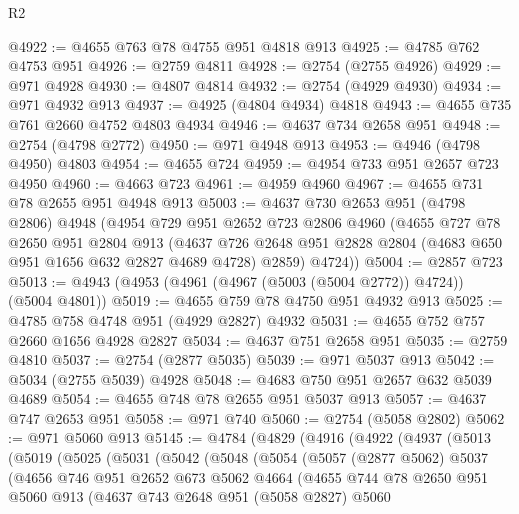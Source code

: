 \begin{lexlean}{R2}
\begin{coremodule}
@4922 := @4655 @763 @78 @4755 @951 @4818 @913
@4925 := @4785 @762 @4753 @951
@4926 := @2759 @4811
@4928 := @2754 (@2755 @4926)
@4929 := @971 @4928
@4930 := @4807 @4814
@4932 := @2754 (@4929 @4930)
@4934 := @971 @4932 @913
@4937 := @4925 (@4804 @4934) @4818
@4943 := @4655 @735 @761 @2660 @4752 @4803 @4934
@4946 := @4637 @734 @2658 @951
@4948 := @2754 (@4798 @2772)
@4950 := @971 @4948 @913
@4953 := @4946 (@4798 @4950) @4803
@4954 := @4655 @724
@4959 := @4954 @733 @951 @2657 @723 @4950
@4960 := @4663 @723
@4961 := @4959 @4960
@4967 := @4655 @731 @78 @2655 @951 @4948 @913
@5003 := @4637
    @730
    @2653
    @951
    (@4798 @2806)
    @4948
    (@4954
      @729
      @951
      @2652
      @723
      @2806
      @4960
      (@4655
        @727
        @78
        @2650
        @951
        @2804
        @913
        (@4637 @726 @2648 @951 @2828 @2804 (@4683 @650 @951 @1656 @632 @2827 @4689 @4728) @2859)
        @4724))
@5004 := @2857 @723
@5013 := @4943 (@4953 (@4961 (@4967 (@5003 (@5004 @2772)) @4724)) (@5004 @4801))
@5019 := @4655 @759 @78 @4750 @951 @4932 @913
@5025 := @4785 @758 @4748 @951 (@4929 @2827) @4932
@5031 := @4655 @752 @757 @2660 @1656 @4928 @2827
@5034 := @4637 @751 @2658 @951
@5035 := @2759 @4810
@5037 := @2754 (@2877 @5035)
@5039 := @971 @5037 @913
@5042 := @5034 (@2755 @5039) @4928
@5048 := @4683 @750 @951 @2657 @632 @5039 @4689
@5054 := @4655 @748 @78 @2655 @951 @5037 @913
@5057 := @4637 @747 @2653 @951
@5058 := @971 @740
@5060 := @2754 (@5058 @2802)
@5062 := @971 @5060 @913
@5145 := @4784
    (@4829
      (@4916
        (@4922
          (@4937
            (@5013
              (@5019
                (@5025
                  (@5031
                    (@5042
                      (@5048
                        (@5054
                          (@5057
                            (@2877 @5062)
                            @5037
                            (@4656
                              @746
                              @951
                              @2652
                              @673
                              @5062
                              @4664
                              (@4655
                                @744
                                @78
                                @2650
                                @951
                                @5060
                                @913
                                (@4637
                                  @743
                                  @2648
                                  @951
                                  (@5058 @2827)
                                  @5060

\end{coremodule}
\end{lexlean}
